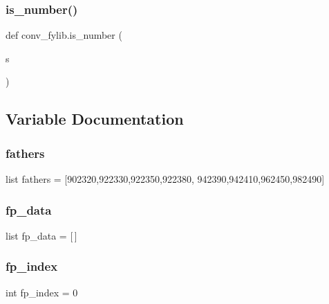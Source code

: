 \subsubsection{\texorpdfstring{is\+\_\+number()}{is\_number()}}
{\footnotesize\ttfamily def conv\+\_\+fylib.\+is\+\_\+number (\begin{DoxyParamCaption}\item[{}]{s }\end{DoxyParamCaption})}



\subsection{Variable Documentation}
\mbox{\label{namespaceconv__fylib_ad8e97c5896c10feb732a59a2b4d0e31b}} 
\subsubsection{\texorpdfstring{fathers}{fathers}}
{\footnotesize\ttfamily list fathers = \mbox{[}\textquotesingle{}902320\textquotesingle{},\textquotesingle{}922330\textquotesingle{},\textquotesingle{}922350\textquotesingle{},\textquotesingle{}922380\textquotesingle{}, \textquotesingle{}942390\textquotesingle{},\textquotesingle{}942410\textquotesingle{},\textquotesingle{}962450\textquotesingle{},\textquotesingle{}982490\textquotesingle{}\mbox{]}}

\mbox{\label{namespaceconv__fylib_add202a6323bab0226c7a3970b46b9e4b}} 
\subsubsection{\texorpdfstring{fp\+\_\+data}{fp\_data}}
{\footnotesize\ttfamily list fp\+\_\+data = \mbox{[}$\,$\mbox{]}}

\mbox{\label{namespaceconv__fylib_a31a37b786314547a9357dd7a7009925a}} 
\subsubsection{\texorpdfstring{fp\+\_\+index}{fp\_index}}
{\footnotesize\ttfamily int fp\+\_\+index = 0}

